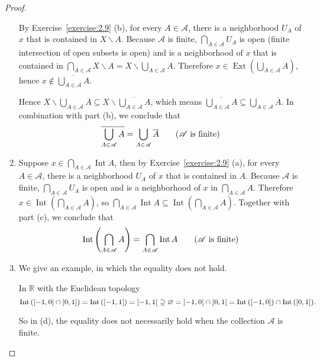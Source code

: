 \begin{proof}
\begin{enumerate}[label={(\alph*)}]
		      By Exercise~\ref{exercise:2.9} (b), for every $A\in\mathscr{A}$, there is a neighborhood $U_{A}$ of $x$ that is contained in $X\smallsetminus A$. Because $\mathscr{A}$ is finite, $\bigcap_{A\in\mathscr{A}}U_{A}$ is open (finite intersection of open subsets is open) and is a neighborhood of $x$ that is contained in $\bigcap_{A\in\mathscr{A}}X\smallsetminus A = X\smallsetminus\bigcup_{A\in\mathscr{A}}A$. Therefore $x\in \operatorname{Ext}\left({\bigcup_{A\in\mathscr{A}}A}\right)$, hence $x\notin\overline{\bigcup_{A\in\mathscr{A}}A}$.

		      Hence $X\smallsetminus \bigcup_{A\in\mathscr{A}}\overline{A} \subseteq X\smallsetminus \overline{\bigcup_{A\in\mathscr{A}}A}$, which means $\overline{\bigcup_{A\in\mathscr{A}}A}\subseteq \bigcup_{A\in\mathscr{A}}\overline{A}$. In combination with part (b), we conclude that
		      \[
			      \overline{\bigcup_{A\in\mathscr{A}}A} = \bigcup_{A\in\mathscr{A}}\overline{A} \tag{$\mathscr{A}$ is finite}
		      \]
		\item Suppose $x\in \bigcap_{A\in\mathscr{A}}\operatorname{Int}A$, then by Exercise~\ref{exercise:2.9} (a), for every $A\in\mathscr{A}$, there is a neighborhood $U_{A}$ of $x$ that is contained in $A$. Because $\mathscr{A}$ is finite, $\bigcap_{A\in\mathscr{A}}U_{A}$ is open and is a neighborhood of $x$ in $\bigcap_{A\in\mathscr{A}}A$. Therefore $x\in \operatorname{Int}\left(\bigcap_{A\in\mathscr{A}}A\right)$, so $\bigcap_{A\in\mathscr{A}}\operatorname{Int}A \subseteq \operatorname{Int}\left(\bigcap_{A\in\mathscr{A}}A\right)$. Together with part (c), we conclude that
		      \[
			      \operatorname{Int}\left(\bigcap_{A\in\mathscr{A}}A\right) = \bigcap_{A\in\mathscr{A}}\operatorname{Int}A \tag{$\mathscr{A}$ is finite}
		      \]
		\item We give an example, in which the equality does not hold.

		      In $\mathbb{R}$ with the Euclidean topology
		      \[
			      \operatorname{Int}\left({\left[{-1,0}\right] \cap \left[{0,1}\right]}\right) = \operatorname{Int}{\left(\left[{-1,1}\right]\right)} = \left]{-1,1}\right[ \supsetneq \varnothing = \left]{-1,0}\right[ \cap \left]{0,1}\right[ = \operatorname{Int}{\left(\left[{-1,0}\right]\right)}\cap\operatorname{Int}{\left(\left[{0,1}\right]\right)}.
		      \]

		      So in (d), the equality does not necessarily hold when the collection $\mathscr{A}$ is finite.
	\end{enumerate}
\end{proof}


